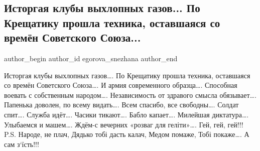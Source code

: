  
 
 
 
 
 
\subsection{Исторгая клубы выхлопных газов... По Крещатику прошла техника, оставшаяся со времён Советского Союза...}
\label{sec:24_08_2021.fb.egorova_snezhana.6.parad_nezalezhnist}
 
\ifcmt
 author_begin
   author_id egorova_snezhana
 author_end
\fi

\obeycr
Исторгая клубы выхлопных газов….
По Крещатику прошла техника, оставшаяся со времён Советского Союза….
И армия современного образца….
Способная воевать с собственным народом….
Независимость от здравого смысла обязывает….
Папенька доволен, по всему видать….
Всем спасибо, все свободны….
Солдат спит….
Служба идёт….
Часики тикают….
Бабло капает….
Милейшая диктатура….
Улыбаемся и машем….
Ждём-с вечерних «розваг для геліти»….
Гей, гей, гей!!!
P.S. Народе, не плач,
Дядько тобі дасть калач, 
Медом помаже,
Тобі покаже….
А сам з‘їсть!!!
\restorecr


